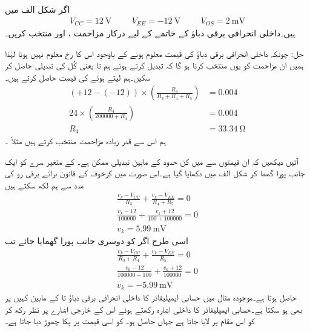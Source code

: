 اگر شکل  الف میں
\begin{align*}
V_{CC} =\SI{12}{\volt} \hspace{1cm} V_{EE}=\SI{-12}{\volt} \hspace{1cm} V_{OS}=\SI{2}{\milli \volt}
\end{align*}
ہیں۔داخلی انحرافی برقی دباؤ کے خاتمے کے لیے درکار مزاحمت ،  اور  منتخب کریں۔

حل:	چونکہ داخلی انحرافی برقی دباؤ کی قیمت معلوم ہونے کے باوجود اس کا رخ معلوم نہیں ہوتا لہٰذا ہمیں ان مزاحمت کو یوں منتخب کرنا ہو گا کہ  تبدیل کرتے ہوئے ہم  تا  یعنی کُل  کی تبدیلی حاصل کر سکیں۔ہم لیتے ہوئے  کی قیمت حاصل کرتے ہیں۔
\begin{align*}
 \left(+12-(-12) \right ) \times \left (\frac{R_4}{R_3+R_4+R_5} \right )&=0.004\\
 24 \times \left ( \frac{R_4}{200000+R_4} \right )&=0.004\\
 R_4 &= \SI{33.34}{\ohm}
\end{align*}
ہم اس سے قدر زیادہ مزاحمت منتخب کرتے ہیں مثلاً ۔

آئیں دیکھیں کہ ان قیمتوں سے  میں کن حدود کے مابین تبدیلی ممکن ہے۔ کے متغیر سرے کو ایک جانب پورا گھما کر شکل  الف     میں دکھایا گیا ہے۔اس صورت میں کرخوف کے قانون برائے برقی رو کی مدد سے ہم لکھ سکتے ہیں
\begin{align*}
\frac{v_k-V_{CC}}{R_3}+\frac{v_k-V_{EE}}{R_4+R_5}=0\\
\frac{v_k-12}{100000}+\frac{v_k+12}{100+100000}=0\\
v_k=\SI{5.99}{\milli \volt}
\end{align*}
اسی طرح اگر  کو دوسری جانب پورا گھمایا جائے تب
\begin{align*}
\frac{v_k-V_{CC}}{R_3+R_4}+\frac{v_k-V_{EE}}{R_5}=0\\
\frac{v_k-12}{100000+100}+\frac{v_k+12}{100000}=0\\
v_k=-\SI{5.99}{\milli \volt}
\end{align*}
حاصل ہوتا ہے۔موجودہ مثال میں حسابی ایمپلیفائر کا داخلی انحرافی برقی دباؤ  تا کے مابین کہیں پر بھی ہو سکتا ہے۔حسابی ایمپلیفائر کا داخلی اشارہ  رکھتے ہوئے اس  کے خارجی اشارے   پر نظر رکھ کر  کو اس مقام پر لایا جاتا ہے جہاں  حاصل ہو۔ کو اسی قیمت پر پکا چھوڑ دیا جاتا ہے۔

